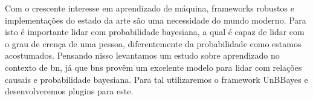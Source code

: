 Com o crescente interesse em aprendizado de máquina, frameworks robustos e implementações do estado da arte são uma necessidade do mundo moderno. Para isto é importante lidar com probabilidade bayesiana, a qual é capaz de lidar com o grau de crença de uma pessoa, diferentemente da probabilidade como estamos acostumados. Pensando nisso levantamos um estudo sobre aprendizado no contexto de \gls{bn}, já que \glspl{bn} provêm um excelente modelo para lidar com relações causais e probabilidade bayesiana. Para tal utilizaremos o framework UnBBayes e desenvolveremos plugins para este.
